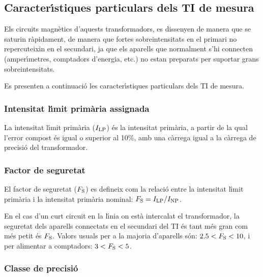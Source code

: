 \subsection{Caracter\'{\i}stiques particulars dels TI de mesura}

Els circuits magn\`{e}tics d'aquests transformadors, es dissenyen de
manera que se saturin r\`{a}pidament, de manera que fortes
sobreintensitats en el primari  no repercuteixin en el secundari,
ja que els aparells que normalment s'hi connecten (amper\'{\i}metres,
comptadors d'energia, etc.) no estan preparats per suportar grans
sobreintensitats.

Es presenten a continuaci\'{o} les caracter\'{\i}stiques particulars dels TI
de mesura.

\subsubsection{Intensitat l\'{\i}mit prim\`{a}ria  assignada}

 La intensitat l\'{\i}mit prim\`{a}ria
($I_\mathrm{LP}$) \'{e}s la intensitat prim\`{a}ria, a partir de la qual l'error compost \'{e}s igual
o superior al 10\unit{\%}, amb una c\`{a}rrega igual a la c\`{a}rrega de
precisi\'{o} del transformador.

\subsubsection{Factor de seguretat}

 El factor de seguretat
($F_\mathrm{S}$) es defineix com la relaci\'{o} entre la intensitat l\'{\i}mit prim\`{a}ria
i la intensitat prim\`{a}ria nominal: $F_\mathrm{S} = I_\mathrm{LP} / I_\mathrm{NP}$.

En el cas d'un curt circuit en la l\'{\i}nia on est\`{a} intercalat el
transformador, la seguretat dels aparells connectats en el secundari
del TI \'{e}s tant m\'{e}s gran com m\'{e}s petit \'{e}s  $F_\mathrm{S}$. Valors usuals
per a la majoria d'aparells s\'{o}n:  $\num{2,5}<F_\mathrm{S}<10$, i per
alimentar a comptadors: $3<F_\mathrm{S}<5$.

\subsubsection{Classe de precisi\'{o}}

